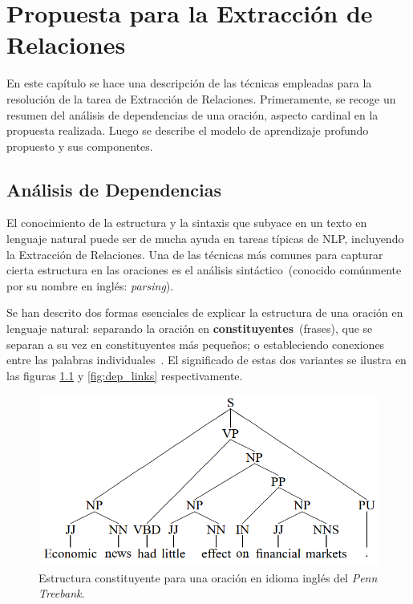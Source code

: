 \chapter{Propuesta para la Extracción de Relaciones}\label{chapter:relations}

En este capítulo se hace una descripción de las técnicas empleadas para la resolución de la tarea de Extracción de Relaciones.
Primeramente, se recoge un resumen del análisis de dependencias de una oración, aspecto cardinal en la propuesta realizada.
Luego se describe el modelo de aprendizaje profundo propuesto y sus componentes.


\section{Análisis de Dependencias}\label{sec:parsing}

El conocimiento de la estructura y la sintaxis que subyace en un texto en lenguaje natural puede ser de mucha ayuda en tareas típicas de NLP, incluyendo la Extracción de Relaciones.
Una de las técnicas más comunes para capturar cierta estructura en las oraciones es el análisis sintáctico~(conocido comúnmente por su nombre en inglés: \emph{parsing}).

Se han descrito dos formas esenciales de explicar la estructura de una oración en lenguaje natural: separando la oración en \textbf{constituyentes}~(frases), que se separan a su vez en constituyentes más pequeños; o estableciendo conexiones entre las palabras individuales~\cite{covington2001fundamental}.
El significado de estas dos variantes se ilustra en las figuras \ref{fig:dep_const} y \ref{fig:dep_links} respectivamente.

\begin{figure}[h!]
	\centering
	\includegraphics[width=0.8\linewidth]{Graphics/dep_const.png}
	\caption{Estructura constituyente para una oración en idioma inglés del \emph{Penn Treebank}.}\label{fig:dep_const}
\end{figure}

